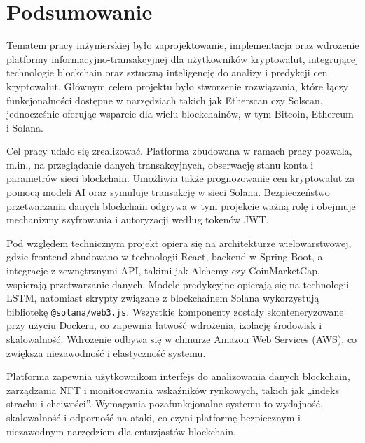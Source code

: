 \chapter{Podsumowanie}
Tematem pracy inżynierskiej było zaprojektowanie, implementacja oraz wdrożenie platformy informacyjno-transakcyjnej dla użytkowników kryptowalut, integrującej technologie blockchain oraz sztuczną inteligencję do analizy i predykcji cen kryptowalut. Głównym celem projektu było stworzenie rozwiązania, które łączy funkcjonalności dostępne w narzędziach takich jak Etherscan czy Solscan, jednocześnie oferując wsparcie dla wielu blockchainów, w tym Bitcoin, Ethereum i Solana. 

Cel pracy udało się zrealizować. Platforma zbudowana w ramach pracy pozwala, m.in., na przeglądanie danych transakcyjnych, obserwację stanu konta i parametrów sieci blockchain. Umożliwia także prognozowanie cen kryptowalut za pomocą modeli AI oraz symuluje transakcję w sieci Solana. Bezpieczeństwo przetwarzania danych blockchain odgrywa w tym projekcie ważną rolę i obejmuje mechanizmy szyfrowania i autoryzacji według tokenów JWT.

Pod względem technicznym projekt opiera się na architekturze wielowarstwowej, gdzie frontend zbudowano w technologii React, backend w Spring Boot, a integracje z zewnętrznymi API, takimi jak Alchemy czy CoinMarketCap, wspierają przetwarzanie danych. Modele predykcyjne opierają się na technologii LSTM, natomiast skrypty związane z blockchainem Solana wykorzystują bibliotekę \texttt{@solana/web3.js}. Wszystkie komponenty zostały skonteneryzowane przy użyciu Dockera, co zapewnia łatwość wdrożenia, izolację środowisk i skalowalność. Wdrożenie odbywa się w chmurze Amazon Web Services (AWS), co zwiększa niezawodność i elastyczność systemu.

Platforma zapewnia użytkownikom interfejs do analizowania danych blockchain, zarządzania NFT i monitorowania wskaźników rynkowych, takich jak „indeks strachu i chciwości”. Wymagania pozafunkcjonalne systemu to wydajność, skalowalność i odporność na ataki, co czyni platformę bezpiecznym i niezawodnym narzędziem dla entuzjastów blockchain.